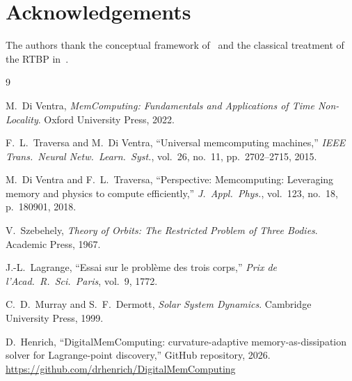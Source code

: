 \documentclass[10pt,twocolumn]{article}
\begin{document}
\section*{Acknowledgements}
The authors thank the conceptual framework of~\cite{diventra2022} and the
classical treatment of the RTBP in~\cite{szebehely1967}.

\clearpage
\onecolumn

\begin{thebibliography}{9}
\setlength{\itemsep}{2pt}

M.~Di Ventra, \textit{MemComputing: Fundamentals and Applications of Time
Non-Locality}. Oxford University Press, 2022.

F.~L.~Traversa and M.~Di Ventra, ``Universal memcomputing machines,''
\textit{IEEE Trans.\ Neural Netw.\ Learn.\ Syst.}, vol.~26, no.~11,
pp.~2702--2715, 2015.

M.~Di Ventra and F.~L.~Traversa, ``Perspective: Memcomputing: Leveraging memory
and physics to compute efficiently,'' \textit{J.~Appl.\ Phys.}, vol.~123,
no.~18, p.~180901, 2018.

V.~Szebehely, \textit{Theory of Orbits: The Restricted Problem of Three Bodies}.
Academic Press, 1967.

J.-L.~Lagrange, ``Essai sur le probl\`eme des trois corps,'' \textit{Prix de
l'Acad.\ R.\ Sci.\ Paris}, vol.~9, 1772.

C.~D.~Murray and S.~F.~Dermott, \textit{Solar System Dynamics}.
Cambridge University Press, 1999.

D.~Henrich, ``DigitalMemComputing: curvature-adaptive memory-as-dissipation
solver for Lagrange-point discovery,'' GitHub repository, 2026.
\url{https://github.com/drhenrich/DigitalMemComputing}

\end{thebibliography}
\end{document}
